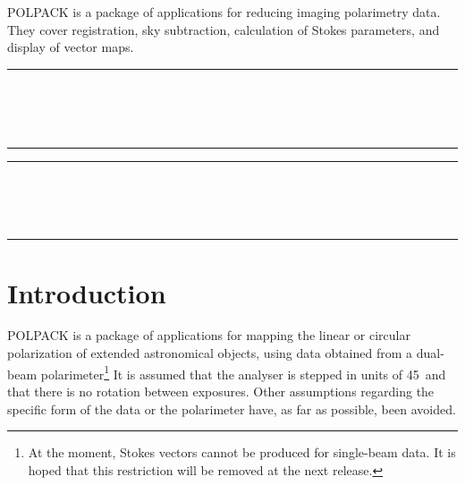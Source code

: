 POLPACK is a package of applications for reducing imaging polarimetry data. 
They cover registration, sky subtraction, calculation of Stokes
parameters, and display of vector maps.

 \begin{latexonly}
   \newpage
   \markright{\stardocname}
   \null\vspace{5mm}
   \begin {center}
   \rule{80mm}{0.5mm} \\ [1ex]
   {\Large\bf \stardoctitle \\ [2.5ex]
    \normalsize \stardocversion} \\ [2ex]
   \rule{80mm}{0.5mm}
   \end{center}
   \setlength{\parskip}{0mm}
   \latexonlytoc
   \setlength{\parskip}{\medskipamount}
 \end{latexonly}
\newpage
\renewcommand{\thepage}{\arabic{page}}
\setcounter{page}{1}
\begin{latexonly}
  \begin {center}
     \rule{80mm}{0.5mm} \\ [1ex]
     {\Large\bf   \stardoctitle \\ [2.5ex]
      \normalsize \stardocversion} \\ [2ex]
    \rule{80mm}{0.5mm}
  \end{center}
\end{latexonly}

\section{Introduction}
POLPACK is a package of applications for mapping the linear or circular
polarization of extended astronomical objects, using data obtained from a
dual-beam polarimeter\footnote{At the moment, Stokes vectors cannot be
produced for single-beam data. It is hoped that this restriction will be
removed at the next release.} It is assumed that the analyser is stepped
in units of 45\dgs\ and that there is no rotation between exposures.
Other assumptions regarding the specific form of the data or the
polarimeter have, as far as possible, been avoided.

